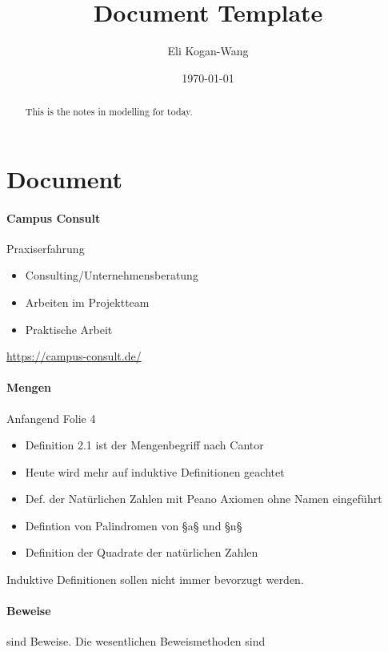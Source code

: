 \documentclass[a4paper,12pt]{article}
\title{Document Template}
\author{Eli Kogan-Wang}
\date{\today}
\begin{document}
\renewcommand{\abstractname}{Abstract}
\begin{abstract}
    This is the notes in modelling for today.
\end{abstract}
\section{Document}

\paragraph{Campus Consult} Praxiserfahrung

\begin{itemize}
    \item Consulting/Unternehmensberatung
    \item Arbeiten im Projektteam
    \item Praktische Arbeit
\end{itemize}

\url{https://campus-consult.de/}

\paragraph{Mengen} Anfangend Folie 4


\begin{itemize}
    \item Definition 2.1 ist der Mengenbegriff nach Cantor
    \item Heute wird mehr auf induktive Definitionen geachtet
    \item Def. der Natürlichen Zahlen mit Peano Axiomen ohne Namen eingeführt
    \item Defintion von Palindromen von §a§ und §n§
    \item Definition der Quadrate der natürlichen Zahlen
\end{itemize}

Induktive Definitionen sollen nicht immer bevorzugt werden.


\paragraph{Beweise} sind Beweise. Die wesentlichen Beweismethoden sind
\end{document}
